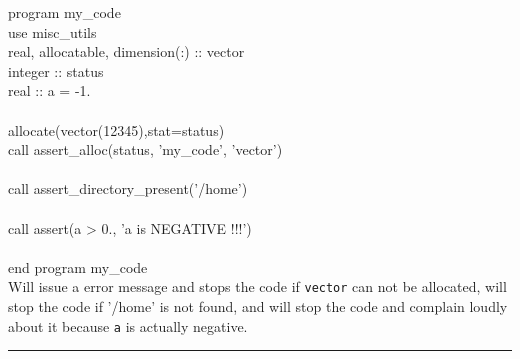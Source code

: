 
\begin{example}
{
program my\_code \\
use misc\_utils \\
real, allocatable, dimension(:) :: vector\\
integer :: status \\
real :: a = -1. \\
\\
allocate(vector(12345),stat=status) \\
call assert\_alloc(status, 'my\_code', 'vector') \\
\\
call assert\_directory\_present('/home') \\
\\
call assert(a > 0., 'a is NEGATIVE !!!') \\
\\
end program my\_code\\
}
{ Will issue a error message and stops the code if {\tt vector} can not be allocated, will stop the
  code if '/home' is not found, and will stop the code and complain loudly about it 
because {\tt a} is actually negative.
}
\end{example}



\rule{\hsize}{2mm}

\newpage
